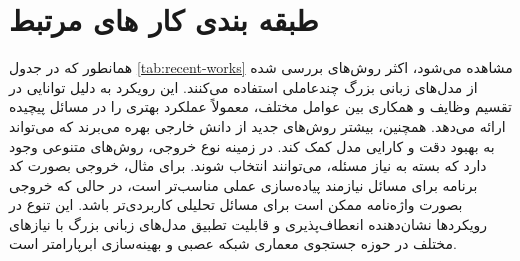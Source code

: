 \section{طبقه بندی کار های مرتبط}
همانطور که در جدول \ref{tab:recent-works} مشاهده می‌شود، اکثر روش‌های بررسی شده از مدل‌های زبانی بزرگ چندعاملی استفاده می‌کنند. این رویکرد به دلیل توانایی در تقسیم وظایف و همکاری بین عوامل مختلف، معمولاً عملکرد بهتری را در مسائل پیچیده ارائه می‌دهد. همچنین، بیشتر روش‌های جدید از دانش خارجی بهره می‌برند که می‌تواند به بهبود دقت و کارایی مدل کمک کند. در زمینه نوع خروجی، روش‌های متنوعی وجود دارد که بسته به نیاز مسئله، می‌توانند انتخاب شوند. برای مثال، خروجی بصورت کد برنامه برای مسائل نیازمند پیاده‌سازی عملی مناسب‌تر است، در حالی که خروجی بصورت واژه‌نامه ممکن است برای مسائل تحلیلی کاربردی‌تر باشد. این تنوع در رویکردها نشان‌دهنده انعطاف‌پذیری و قابلیت تطبیق مدل‌های زبانی بزرگ با نیازهای مختلف در حوزه جستجوی معماری شبکه عصبی و بهینه‌سازی ابرپارامتر است.

